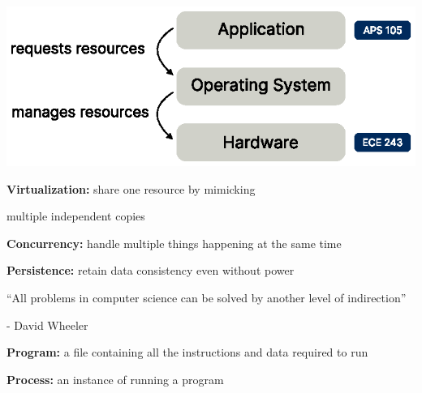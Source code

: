 \begin{slide}
  

  \centering

  \includegraphics{operating-system-overview.eps}

\end{slide}

\begin{slide}
  

  \textbf{Virtualization:} share one resource by mimicking
  
  \leftspace{}multiple independent copies
  \bigskip

  \textbf{Concurrency:} handle multiple things happening at the same time
  \bigskip

  \textbf{Persistence:} retain data consistency even without power
\end{slide}

\begin{slide}

  ``All problems in computer science can be solved by another level of
  indirection''

  \begin{flushright}
    - David Wheeler
  \end{flushright}

\end{slide}

\begin{slide}
  

  \textbf{Program:} a file containing all the instructions and data required
  to run
  \bigskip

  \textbf{Process:} an instance of running a program
\end{slide}

